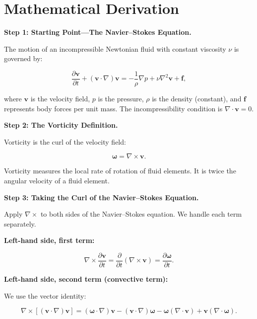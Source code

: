 \section*{Mathematical Derivation}

\textbf{Step 1: Starting Point---The Navier--Stokes Equation.}

The motion of an incompressible Newtonian fluid with constant viscosity $\nu$ is governed by:

\begin{equation}
\frac{\partial \mathbf{v}}{\partial t} + (\mathbf{v}\cdot\nabla)\mathbf{v} = -\frac{1}{\rho}\nabla p + \nu\nabla^2\mathbf{v} + \mathbf{f},
\end{equation}

where $\mathbf{v}$ is the velocity field, $p$ is the pressure, $\rho$ is the density (constant), and $\mathbf{f}$ represents body forces per unit mass. The incompressibility condition is $\nabla\cdot\mathbf{v} = 0$.

\textbf{Step 2: The Vorticity Definition.}

Vorticity is the curl of the velocity field:

\begin{equation}
\boldsymbol{\omega} = \nabla \times \mathbf{v}.
\end{equation}

Vorticity measures the local rate of rotation of fluid elements. It is twice the angular velocity of a fluid element.

\textbf{Step 3: Taking the Curl of the Navier--Stokes Equation.}

Apply $\nabla\times$ to both sides of the Navier--Stokes equation. We handle each term separately.

\textbf{Left-hand side, first term:}

\begin{equation}
\nabla\times\frac{\partial \mathbf{v}}{\partial t} = \frac{\partial}{\partial t}(\nabla\times\mathbf{v}) = \frac{\partial \boldsymbol{\omega}}{\partial t}.
\end{equation}

\textbf{Left-hand side, second term (convective term):}

We use the vector identity:

\begin{equation}
\nabla\times\left[(\mathbf{v}\cdot\nabla)\mathbf{v}\right] = (\boldsymbol{\omega}\cdot\nabla)\mathbf{v} - (\mathbf{v}\cdot\nabla)\boldsymbol{\omega} - \boldsymbol{\omega}(\nabla\cdot\mathbf{v}) + \mathbf{v}(\nabla\cdot\boldsymbol{\omega}).
\end{equation}

